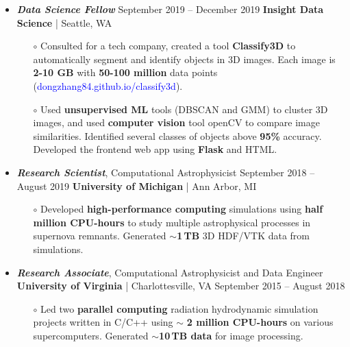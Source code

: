 \documentclass[10pt]{res}
\begin{document}
\begin{resume}
\begin{itemize} [leftmargin=0.0cm]
 \vspace{0.1cm}
 
 
\item{\sl \textbf{Data Science Fellow} } \hfill September 2019 --   December 2019 \newline
 \textbf{Insight Data Science} | Seattle, WA 

 \begin{itemize}[leftmargin=0.35cm]
\item[$\circ$] Consulted for a tech company, created a tool {\bf Classify3D} to automatically segment and identify objects in 3D images. Each image is {\bf {2-10 GB}} with \textbf{50-100 million} data points (\textcolor{blue}{dongzhang84.github.io/classify3d}). 
\item[$\circ$] Used \textbf{unsupervised ML} tools (DBSCAN and GMM) to cluster 3D images, and used \textbf{computer vision} tool openCV to compare image similarities. Identified several classes of objects above \textbf{95\%} accuracy. Developed the frontend web app using \textbf{Flask} and HTML.
  \end{itemize}

\vspace{0.1cm}

\item 
{\sl \textbf{Research Scientist}}, Computational Astrophysicist  \hfill September 2018 -- August 2019 \newline
\textbf{University of Michigan} | Ann Arbor, MI

 \begin{itemize}[leftmargin=0.35cm]
 \item[$\circ$] Developed \textbf{high-performance computing} simulations using \textbf{half million CPU-hours} to study multiple astrophysical processes in supernova remnants. Generated  $\sim$\textbf{1\,TB} 3D HDF/VTK data from simulations.
  \end{itemize}
  
 \vspace{0.1cm}
 
\item

{\sl \textbf{Research Associate}}, Computational Astrophysicist and Data Engineer  \newline
\textbf{University of Virginia} | Charlottesville, VA \hfill September 2015 -- August 2018 

 \begin{itemize}[leftmargin=0.35cm]
 \item[$\circ$] Led two \textbf{parallel computing} radiation hydrodynamic simulation projects written in C/C++ using $\sim$ \textbf{2 million CPU-hours} on various supercomputers. Generated $\sim$\textbf{10\,TB data} for image processing.  
 

\end{itemize}
\end{itemize}
\end{resume}
\end{document}
